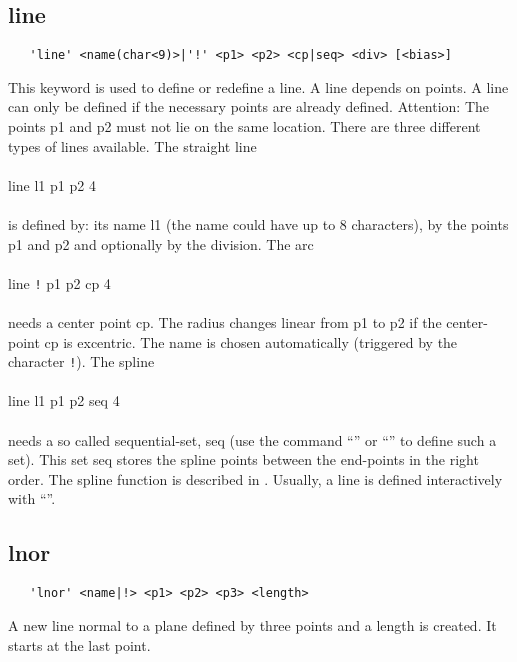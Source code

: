 \documentclass{article}
\begin{document}
\subsection{\label{line}line}
\begin{verbatim}
   'line' <name(char<9)>|'!' <p1> <p2> <cp|seq> <div> [<bias>] 
\end{verbatim}
This keyword is used to define or redefine a line. A line depends on points. A line can only be defined if the necessary points are already defined. Attention: The points p1 and p2 must not lie on the same location. There are three different types of lines available. The straight line\\\\
line l1 p1 p2 4\\\\
is defined by: its name l1 (the name could have up to 8 characters), by the points p1 and p2 and optionally by the division. The arc\\\\
line \verb_!_ p1 p2 cp 4\\\\
needs a center point cp. The radius changes linear from p1 to p2 if the center-point cp is excentric. The name is chosen automatically (triggered by the character \verb_!_). The spline\\\\
line l1 p1 p2 seq 4\\\\
needs a so called sequential-set, seq (use the command ``'' or ``'' to define such a set). This set seq stores the spline points between the end-points in the right order. The spline function is described in \cite{spline}. Usually, a line is defined interactively with ``''. 

\subsection{\label{lnor}lnor}
\begin{verbatim}
   'lnor' <name|!> <p1> <p2> <p3> <length> 
\end{verbatim}
A new line normal to a plane defined by three points and a length is created. It starts at the last point.
\end{document}
